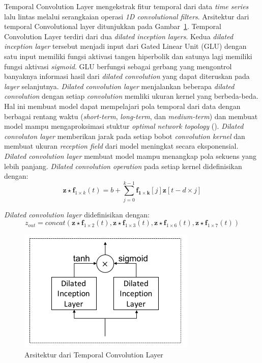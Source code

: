 Temporal Convolution Layer mengekstrak  fitur temporal dari data \textit{time series} lalu lintas melalui serangkaian operasi \textit{1D convolutional filters}. Arsitektur dari temporal Convolutional layer ditunjukkan pada Gambar~\ref{fig:tc-layer}. Temporal Convolution Layer terdiri dari dua \textit{dilated inception layers}. Kedua \textit{dilated inception layer} tersebut menjadi input dari Gated Linear Unit (GLU) dengan satu input memiliki fungsi aktivasi tangen hiperbolik dan satunya lagi memiliki fungsi aktivasi \textit{sigmoid}. GLU berfungsi sebagai gerbang yang mengontrol banyaknya informasi hasil dari \textit{dilated convolution} yang dapat diteruskan pada \textit{layer} selanjutnya. \textit{Dilated convolution layer} menjalankan beberapa \textit{dilated convolution} dengan setiap \textit{convolution} memliki ukuran kernel yang berbeda-beda. Hal ini membuat model dapat mempelajari pola temporal dari data dengan berbagai rentang waktu (\textit{short-term}, \textit{long-term}, dan \textit{medium-term}) dan membuat model mampu mengaproksimasi stuktur \textit{optimal network topology} (\cite{Wu2020}). \textit{Dilated convoluton layer} memberikan jarak pada setiap bobot \textit{convolution kernel} dan membuat ukuran \textit{reception field } dari model meningkat secara eksponensial. \textit{Dilated convolution layer} membuat model mampu menangkap pola sekuens yang lebih panjang. \textit{Dilated convolution operation} pada setiap kernel didefinisikan dengan:
\begin{equation}
    \mathbf{z} \star \mathbf{f}_{1\times k}(t)  =b+\sum_{j=0}^{k-1}  \mathbf{f_{1\times k}}[j] \mathbf{z}[t-d\times j]
\end{equation}

\textit{Dilated convolution layer} didefinisikan dengan:
\begin{equation}
    z_{out}= concat(\mathbf{z} \star \mathbf{f}_{1\times 2}(t), \mathbf{z} \star \mathbf{f}_{1\times 3}(t), \mathbf{z} \star \mathbf{f}_{1\times 6}(t), \mathbf{z} \star \mathbf{f}_{1\times 7}(t))
\end{equation}

\begin{figure}[H]
    \centering
    \includegraphics[]{figures/tc_layer.png}
    \caption{Arsitektur dari Temporal Convolution Layer}
    \label{fig:tc-layer}
\end{figure}


